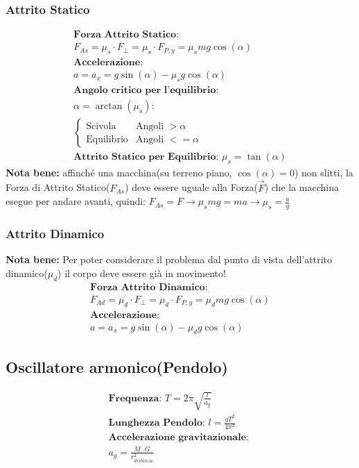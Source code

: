 \subsubsection{Attrito Statico}
\begin{gather*}
    \textbf{Forza Attrito Statico: } \\ F_{As} = \mu_s \cdot F_\perp = \mu_s \cdot F_{P, y} = \mu_s m g \cos (\alpha) \\
    \textbf{Accelerazione: } \\ a = a_x = g \sin (\alpha) - \mu_s g \cos (\alpha) \\
    \textbf{Angolo critico per l'equilibrio: } \\ \alpha = \arctan (\mu_s) : \\
    \begin{cases}
        \text{Scivola} & \text{Angoli } > \alpha \\
        \text{Equilibrio} & \text{Angoli } <= \alpha
    \end{cases}    \\
    \textbf{Attrito Statico per Equilibrio: } \mu_s = \tan (\alpha)
\end{gather*}
\textbf{Nota bene: } affinché una macchina(su terreno piano, $\cos (\alpha) = 0$) non slitti, la Forza di Attrito Statico($F_{As}$) deve essere uguale alla Forza($\vec{F}$) che la macchina esegue per andare avanti, quindi: $F_{As} = F \rightarrow \mu_s m g = m a \rightarrow \mu_s = \frac{a}{g}$
\subsubsection{Attrito Dinamico}
\textbf{Nota bene: } Per poter considerare il problema dal punto di vista dell'attrito dinamico($\mu_d$) il corpo deve essere già in movimento!
\begin{gather*}
    \textbf{Forza Attrito Dinamico:} \\ F_{Ad} = \mu_d \cdot F_\perp = \mu_d \cdot F_{P, y} = \mu_d m g \cos (\alpha) \\
    \textbf{Accelerazione: } \\ a = a_x = g \sin (\alpha) - \mu_d g \cos (\alpha)
\end{gather*}






\subsection{Oscillatore armonico(Pendolo)}
\begin{gather*}
    \textbf{Frequenza: } T = 2 \pi \sqrt{\frac{l}{a_g}} \\
    \textbf{Lunghezza Pendolo: } l = \frac{g T^2}{4 \pi^2} \\
    \textbf{Accelerazione gravitazionale: } \\ a_g = \frac{M \cdot G}{r_{distanza}^2}
\end{gather*}